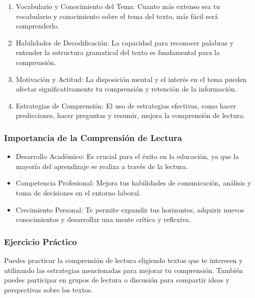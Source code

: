 \begin{enumerate}
      \item Vocabulario y Conocimiento del Tema: Cuanto más extenso sea tu vocabulario y conocimiento sobre el tema del texto, más fácil será comprenderlo.
      \item Habilidades de Decodificación: La capacidad para reconocer palabras y entender la estructura gramatical del texto es fundamental para la comprensión.
      \item Motivación y Actitud: La disposición mental y el interés en el tema pueden afectar significativamente tu comprensión y retención de la información.
      \item Estrategias de Comprensión: El uso de estrategias efectivas, como hacer predicciones, hacer preguntas y resumir, mejora la comprensión de lectura.
\end{enumerate}

\subsubsection{Importancia de la Comprensión de Lectura}
\begin{itemize}
      \item Desarrollo Académico: Es crucial para el éxito en la educación, ya que la mayoría del aprendizaje se realiza a través de la lectura.
      \item Competencia Profesional: Mejora tus habilidades de comunicación, análisis y toma de decisiones en el entorno laboral.
      \item Crecimiento Personal: Te permite expandir tus horizontes, adquirir nuevos conocimientos y desarrollar una mente crítica y reflexiva.
\end{itemize}

\subsubsection{Ejercicio Práctico}
Puedes practicar la comprensión de lectura eligiendo textos que te interesen y utilizando las estrategias mencionadas para mejorar tu comprensión. También puedes participar en grupos de lectura o discusión para compartir ideas y perspectivas sobre los textos.